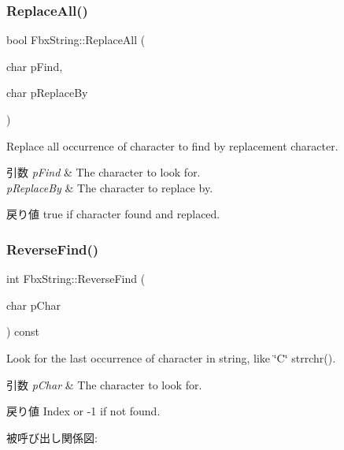 \subsubsection{\texorpdfstring{Replace\+All()}{ReplaceAll()}\hspace{0.1cm}{\footnotesize\ttfamily [2/2]}}
{\footnotesize\ttfamily bool Fbx\+String\+::\+Replace\+All (\begin{DoxyParamCaption}\item[{char}]{p\+Find,  }\item[{char}]{p\+Replace\+By }\end{DoxyParamCaption})}

Replace all occurrence of character to find by replacement character. 
\begin{DoxyParams}{引数}
{\em p\+Find} & The character to look for. \\
\hline
{\em p\+Replace\+By} & The character to replace by. \\
\hline
\end{DoxyParams}
\begin{DoxyReturn}{戻り値}
{\ttfamily true} if character found and replaced. 
\end{DoxyReturn}
\mbox{\label{class_fbx_string_ace5a9c1f1e86a44c5ee70ff7fa70a4a2}} 
\subsubsection{\texorpdfstring{Reverse\+Find()}{ReverseFind()}}
{\footnotesize\ttfamily int Fbx\+String\+::\+Reverse\+Find (\begin{DoxyParamCaption}\item[{char}]{p\+Char }\end{DoxyParamCaption}) const}

Look for the last occurrence of character in string, like \char`\"{}\+C\char`\"{} strrchr(). 
\begin{DoxyParams}{引数}
{\em p\+Char} & The character to look for. \\
\hline
\end{DoxyParams}
\begin{DoxyReturn}{戻り値}
Index or -\/1 if not found. 
\end{DoxyReturn}
被呼び出し関係図\+:
\mbox{\label{class_fbx_string_a48148b426b07c11495d981e026b25857}} 
